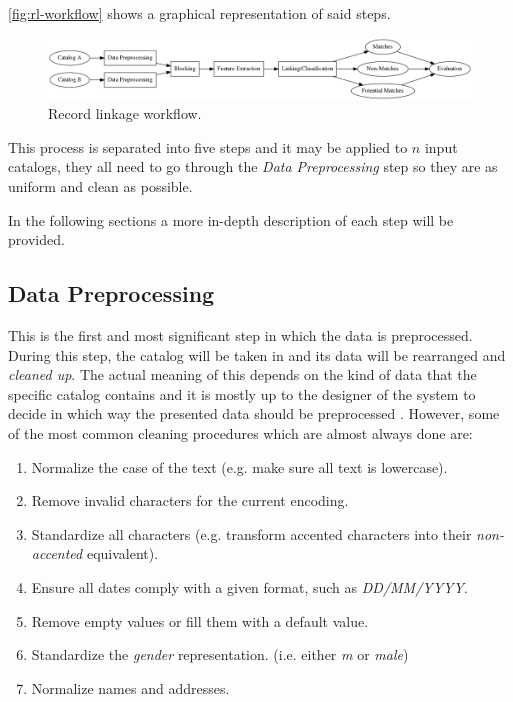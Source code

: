\documentclass[epsfig,a4paper,11pt,titlepage,twoside,openany]{book}
\begin{document}
\autoref{fig:rl-workflow} shows a graphical representation of said steps.

\begin{figure}[H]
  \centering \includegraphics[width=\textwidth]{rl-workflow}
  \caption{Record linkage workflow.}
  \label{fig:rl-workflow}
\end{figure}

This process is separated into five steps and it may be applied to $n$ input catalogs, they all need to go through the \textit{Data Preprocessing} step so they are as uniform and clean as possible. 



In the following sections a more in-depth description of each step will be provided.


\subsection{Data Preprocessing}
\label{sec:rl-workflow-data-preprocessing}

This is the first and most significant step in which the data is preprocessed. During this step, the catalog will be taken in and its data will be rearranged and \textit{cleaned up}. The actual meaning of this depends on the kind of data that the specific catalog
contains and it is mostly up to the designer of the system to decide in which way the presented data
should be preprocessed \cite{Rahm00datacleaning}. 
However, some of the most common cleaning procedures which are almost always done are:

\begin{enumerate}
\item Normalize the case of the text (e.g. make sure all text is lowercase).
\item Remove invalid characters for the current encoding.
\item Standardize all characters (e.g. transform accented characters into their
  \textit{non-accented} equivalent).
\item Ensure all dates comply with a given format, such as \textit{DD/MM/YYYY}.
\item Remove empty values or fill them with a default value.
\item Standardize the \textit{gender} representation. (i.e. either \textit{m} or
  \textit{male})
\item Normalize names and addresses. \cite{Churches2002}
\end{enumerate}
\end{document}
